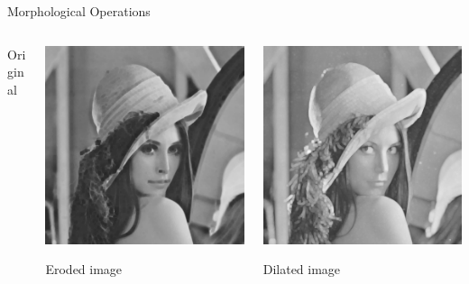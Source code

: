 \begin{frame}{Morphological Operations}
\begin{columns}[onlytextwidth,T]
\begin{column}{0.3\textwidth}
            Original
        \end{column}%
        \begin{column}{0.3\textwidth}
            \centering
            \includegraphics[height=0.5\textheight]{img/lena_er}

            Eroded image
        \end{column}%
        \begin{column}{0.3\textwidth}
            \centering
            \includegraphics[height=0.5\textheight]{img/lena_di}

            Dilated image
        \end{column}
    \end{columns}
\end{frame}

